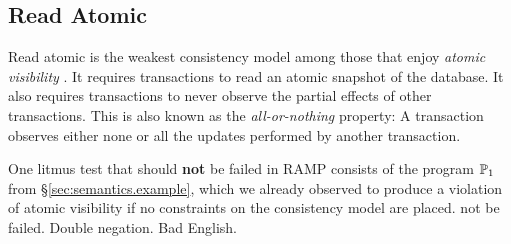 \subsection{Read Atomic} 
Read atomic \cite{ramp} is the weakest consistency model among 
those that enjoy \emph{atomic visibility} \cite{framework-concur}. 
It requires transactions to read an atomic snapshot of the database. 
It also requires transactions to never observe the partial effects of other transactions. 
This is also known as the \emph{all-or-nothing} property: A transaction 
observes either none or all the updates performed by another transaction. 

One litmus test that should \textbf{not} be failed in RAMP consists of the program 
$\mathbb{P}_1$ from \S \ref{sec:semantics.example}, which we already observed 
to produce a violation of atomic visibility if no constraints on the consistency 
model are placed.
\ac{not be failed. Double negation. Bad English.}

